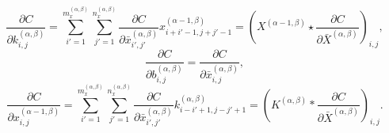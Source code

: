\documentclass[11pt]{article}
\begin{document}
\begin{equation}
    \frac{\partial C}{\partial k_{i,j}^{(\alpha,\beta)}} = \sum_{i'=1}^{m_x^{(\alpha,\beta)}}\sum_{j'=1}^{n_x^{(\alpha,\beta)}} \frac{\partial C}{\partial \bar{x}_{i',j'}^{(\alpha,\beta)}}
    x_{i+i'-1,j+j'-1}^{(\alpha-1,\beta)} = {(X^{(\alpha-1,\beta)} \star \frac{\partial C}{\partial \bar{X}^{(\alpha,\beta)}})}_{i,j},
\end{equation}
\begin{equation}
    \frac{\partial C}{\partial b_{i,j}^{(\alpha,\beta)}} = \frac{\partial C}{\partial \bar{x}_{i,j}^{(\alpha,\beta)}},
\end{equation}
\begin{equation}
    \frac{\partial C}{\partial x_{i,j}^{(\alpha-1,\beta)}} = \sum_{i'=1}^{m_x^{(\alpha,\beta)}}\sum_{j'=1}^{n_x^{(\alpha,\beta)}} \frac{\partial C}{\partial \bar{x}_{i',j'}^{(\alpha,\beta)}} k_{i-i'+1,j-j'+1}^{(\alpha,\beta)}
    = {(K^{(\alpha,\beta)} \ast \frac{\partial C}{\partial \bar{X}^{(\alpha,\beta)}})}_{i,j}.
\end{equation}
\end{document}
